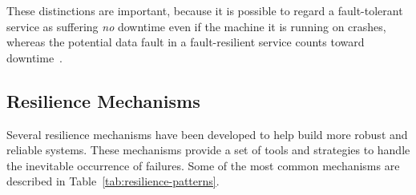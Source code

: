 These distinctions are important,
because it is possible to regard a fault-tolerant service
as suffering \textit{no} downtime even if the machine it is running on crashes,
whereas the potential data fault in a fault-resilient service counts toward downtime~\cite{fault-tolerance-vs-fault-resilience}.

\subsection{Resilience Mechanisms}\label{subsec:resilience-mechanisms}

Several resilience mechanisms have been developed to help build more robust and reliable systems.
These mechanisms provide a set of tools and strategies to handle the inevitable occurrence of failures.
Some of the most common mechanisms are described in Table~\ref{tab:resilience-patterns}.

